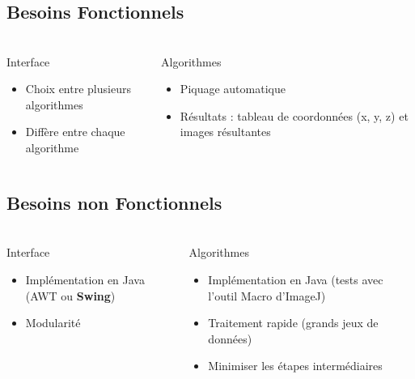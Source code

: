 \documentclass[11pt]{beamer}
\begin{document}
\subsection{Besoins Fonctionnels}
\begin{frame}
\frametitle{\subsecname}
	\begin{columns}[t]
		
		\begin{column}{5cm}
			\begin{block}{Interface}
				\begin{itemize}
					\item Choix entre plusieurs algorithmes
					\item Diffère entre chaque algorithme
				\end{itemize}
			\end{block}
		\end{column}
		\begin{column}{5cm}
			\begin{block}{Algorithmes}
				\begin{itemize}
					\item Piquage automatique
					\item Résultats : tableau de coordonnées (x, y, z) et images résultantes
				\end{itemize}
			\end{block}
		\end{column}
	\end{columns}	
\end{frame}

\subsection{Besoins non Fonctionnels}
\begin{frame}
\frametitle{\subsecname}
	\begin{columns}[t]
		\begin{column}{5cm}
			\begin{block}{Interface}
				\begin{itemize}
					\item Implémentation en Java (AWT ou \textbf{Swing})
					\item Modularité
				\end{itemize}
			\end{block}
		\end{column}
		\begin{column}{5cm}
			\begin{block}{Algorithmes}
				\begin{itemize}
					\item Implémentation en Java (tests avec l'outil Macro d'ImageJ)
					\item Traitement rapide (grands jeux de données)
					\item Minimiser les étapes intermédiaires
				\end{itemize}
			\end{block}
		\end{column}
	\end{columns}
\end{frame}
\end{document}
